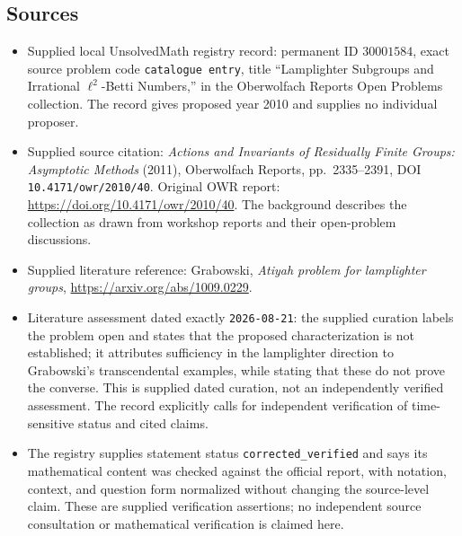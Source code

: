 \documentclass[11pt]{article}
\begin{document}
\subsection{Sources}
\begin{itemize}
\item Supplied local UnsolvedMath registry record: permanent ID \(30001584\), exact source problem code \texttt{catalogue entry}, title ``Lamplighter Subgroups and Irrational \(\ell^2\)-Betti Numbers,'' in the Oberwolfach Reports Open Problems collection. The record gives proposed year 2010 and supplies no individual proposer.
\item Supplied source citation: \emph{Actions and Invariants of Residually Finite Groups: Asymptotic Methods} (2011), Oberwolfach Reports, pp.\ 2335--2391, DOI \texttt{10.4171/owr/2010/40}. Original OWR report: \url{https://doi.org/10.4171/owr/2010/40}. The background describes the collection as drawn from workshop reports and their open-problem discussions.
\item Supplied literature reference: Grabowski, \emph{Atiyah problem for lamplighter groups}, \url{https://arxiv.org/abs/1009.0229}.
\item Literature assessment dated exactly \texttt{2026-08-21}: the supplied curation labels the problem open and states that the proposed characterization is not established; it attributes sufficiency in the lamplighter direction to Grabowski's transcendental examples, while stating that these do not prove the converse. This is supplied dated curation, not an independently verified assessment. The record explicitly calls for independent verification of time-sensitive status and cited claims.
\item The registry supplies statement status \texttt{corrected\_verified} and says its mathematical content was checked against the official report, with notation, context, and question form normalized without changing the source-level claim. These are supplied verification assertions; no independent source consultation or mathematical verification is claimed here.
\end{itemize}
\end{document}
